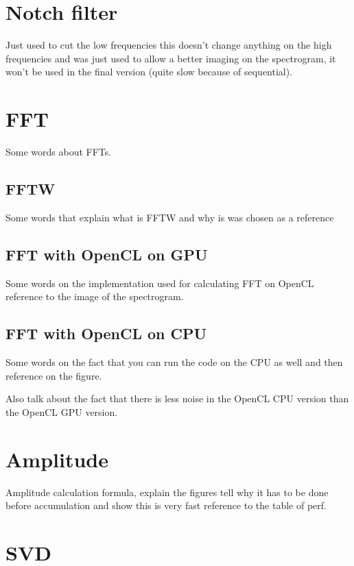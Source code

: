 \section{Notch filter}
\label{sec:notch}

Just used to cut the low frequencies this doesn't change anything on the high frequencies and was just used to allow a better imaging on the spectrogram, it won't be used in the final version (quite slow because of sequential).

\section{FFT}
\label{sec:FFT}

Some words about FFTs.

   \subsection{FFTW}

   Some words that explain what is FFTW and why is was chosen as a reference

   \subsection{FFT with OpenCL on GPU}

   Some words on the implementation used for calculating FFT on OpenCL reference to the image of the spectrogram.

   \subsection{FFT with OpenCL on CPU}

   Some words on the fact that you can run the code on the CPU as well and then reference on the figure.

   Also talk about the fact that there is less noise in the OpenCL CPU version than the OpenCL GPU version.

\section{Amplitude}
\label{sec:amplitude}

Amplitude calculation formula, explain the figures tell why it has to be done before accumulation and show this is very fast reference to the table of perf.

\section{SVD}
\label{sec:SVD}

